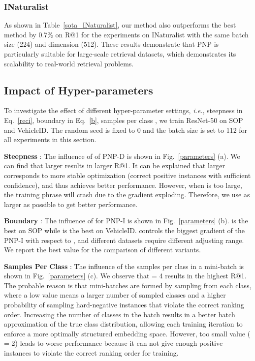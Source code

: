 \subsubsection*{INaturalist}

As shown in Table~\ref{sota_INaturalist}, our method also outperforms the best method by 0.7\% on R@1 for the experiments on INaturalist with the same batch size (224) and dimension (512). These results demonstrate that PNP is particularly suitable for large-scale retrieval datasets, which demonstrates its scalability to real-world retrieval problems. 




\subsection{Impact of Hyper-parameters}



\noindent To investigate the effect of different hyper-parameter settings, \textit{i.e.}, steepness  in Eq.~\ref{reci}, boundary   in Eq.~\ref{b}, samples per class , we train ResNet-50 on SOP and VehicleID. The random seed is fixed to 0 and the batch size is set to 112 for all experiments in this section.


\noindent \textbf{Steepness }: The influence of  of PNP-D is shown in Fig.~\ref{parameters} (a). We can find that larger  results in larger R@1. It can be explained that larger  corresponds to more stable optimization (correct positive instances with sufficient confidence), and thus achieves better performance. However, when  is too large, the training phrase will crash due to the gradient exploding. Therefore, we use as larger  as possible to get better performance.


\noindent \textbf{Boundary} : The influence of  for PNP-I is shown in Fig.~\ref{parameters} (b).  is the best on SOP while  is the best on VehicleID.  controls the biggest gradient of the PNP-I with respect to , and different datasets require different adjusting range. We report the best value for the comparison of different variants.

\noindent \textbf{Samples Per Class }: The influence of the samples per class  in a mini-batch is shown in Fig.~\ref{parameters} (c). We observe that  = 4 results in the highest R@1. The probable reason is that mini-batches are formed by sampling from each class, where a low value means a larger number of sampled classes and a higher probability of sampling hard-negative instances that violate the correct ranking order. Increasing the number of classes in the batch results in a better batch approximation of the true class distribution, allowing each training iteration to enforce a more optimally structured embedding space. However, too small value ( = 2) leads to worse performance because it can not give enough positive instances to violate the correct ranking order for training. 




